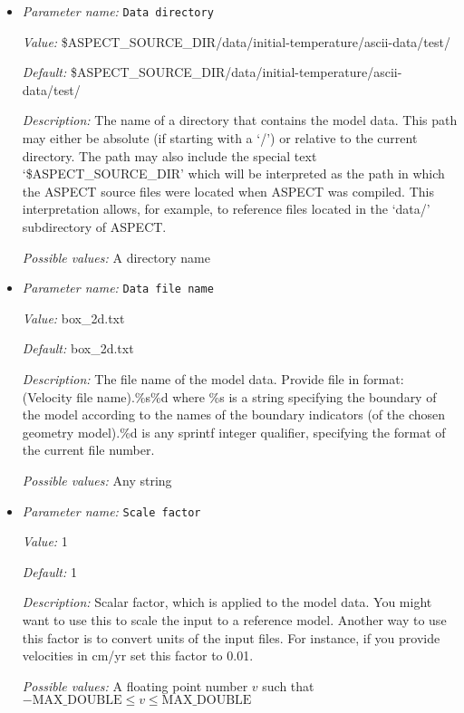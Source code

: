 \begin{itemize}
\item {\it Parameter name:} {\tt Data directory}
\label{parameters:Initial temperature model/Ascii data model/Data directory}


{\it Value:} \$ASPECT\_SOURCE\_DIR/data/initial-temperature/ascii-data/test/


{\it Default:} \$ASPECT\_SOURCE\_DIR/data/initial-temperature/ascii-data/test/


{\it Description:} The name of a directory that contains the model data. This path may either be absolute (if starting with a `/') or relative to the current directory. The path may also include the special text `\$ASPECT\_SOURCE\_DIR' which will be interpreted as the path in which the ASPECT source files were located when ASPECT was compiled. This interpretation allows, for example, to reference files located in the `data/' subdirectory of ASPECT. 


{\it Possible values:} A directory name
\item {\it Parameter name:} {\tt Data file name}
\label{parameters:Initial temperature model/Ascii data model/Data file name}


{\it Value:} box\_2d.txt


{\it Default:} box\_2d.txt


{\it Description:} The file name of the model data. Provide file in format: (Velocity file name).\%s\%d where \%s is a string specifying the boundary of the model according to the names of the boundary indicators (of the chosen geometry model).\%d is any sprintf integer qualifier, specifying the format of the current file number. 


{\it Possible values:} Any string
\item {\it Parameter name:} {\tt Scale factor}
\label{parameters:Initial temperature model/Ascii data model/Scale factor}


{\it Value:} 1


{\it Default:} 1


{\it Description:} Scalar factor, which is applied to the model data. You might want to use this to scale the input to a reference model. Another way to use this factor is to convert units of the input files. For instance, if you provide velocities in cm/yr set this factor to 0.01.


{\it Possible values:} A floating point number $v$ such that $-\text{MAX\_DOUBLE} \leq v \leq \text{MAX\_DOUBLE}$
\end{itemize}

